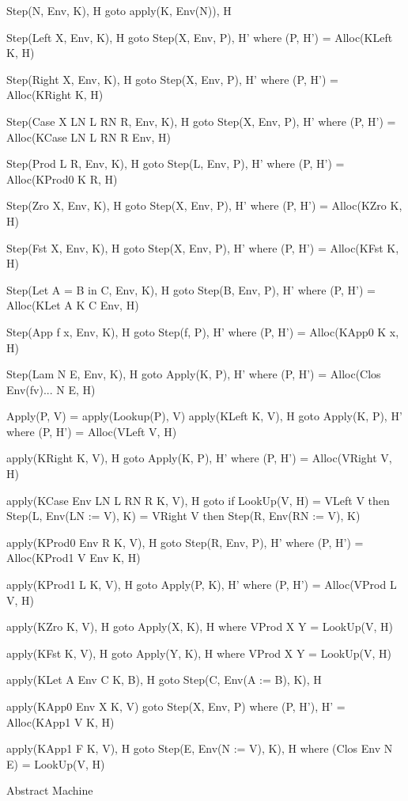 \documentclass[acmsmall]{acmart}
\begin{document}
	\begin{mdframed}
		Step(N, Env, K), H goto apply(K, Env(N)), H

		Step(Left X, Env, K), H goto Step(X, Env, P), H' where (P, H') = Alloc(KLeft K, H)
		
		Step(Right X, Env, K), H goto Step(X, Env, P), H' where (P, H') = Alloc(KRight K, H)
		
		Step(Case X LN L RN R, Env, K), H goto Step(X, Env, P), H' where (P, H') = Alloc(KCase LN L RN R Env, H)
		
		Step(Prod L R, Env, K), H goto Step(L, Env, P), H' where (P, H') = Alloc(KProd0 K R, H)
		
		Step(Zro X, Env, K), H goto Step(X, Env, P), H' where (P, H') = Alloc(KZro K, H)
		
		Step(Fst X, Env, K), H goto Step(X, Env, P), H' where (P, H') = Alloc(KFst K, H)
		
		Step(Let A = B in C, Env, K), H goto Step(B, Env, P), H' where (P, H') = Alloc(KLet A K C Env, H)
		
		Step(App f x, Env, K), H goto Step(f, P), H' where (P, H') = Alloc(KApp0 K x, H)
		
		Step(Lam N E, Env, K), H goto Apply(K, P), H' where (P, H') = Alloc(Clos Env(fv)... N E, H)

		Apply(P, V) = apply(Lookup(P), V)
		apply(KLeft K, V), H goto Apply(K, P), H' where (P, H') = Alloc(VLeft V, H)

		apply(KRight K, V), H goto Apply(K, P), H' where (P, H') = Alloc(VRight V, H)
		
		apply(KCase Env LN L RN R K, V), H goto 
		  if LookUp(V, H) = VLeft V then Step(L, Env(LN := V), K)
		  = VRight V then Step(R, Env(RN := V), K)
		
		apply(KProd0 Env R K, V), H goto Step(R, Env, P), H' where (P, H') = Alloc(KProd1 V Env K, H)
		
		apply(KProd1 L K, V), H goto Apply(P, K), H' where (P, H') = Alloc(VProd L V, H)
		
		apply(KZro K, V), H goto Apply(X, K), H where VProd X Y = LookUp(V, H)

		apply(KFst K, V), H goto Apply(Y, K), H where VProd X Y = LookUp(V, H)
		
		apply(KLet A Env C K, B), H goto Step(C, Env(A := B), K), H
		
		apply(KApp0 Env X K, V) goto Step(X, Env, P) where (P, H'), H' = Alloc(KApp1 V K, H)
		
		apply(KApp1 F K, V), H goto Step(E, Env(N := V), K), H where (Clos Env N E) = LookUp(V, H)

		Abstract Machine
	\end{mdframed}
\end{document}
